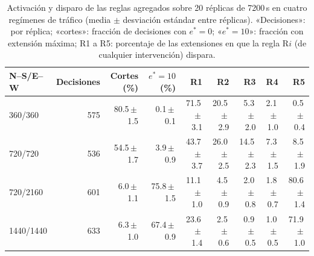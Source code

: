 \begin{table}[!t]
\caption{Activación y disparo de las reglas agregados sobre 20 réplicas de 7200\,s en cuatro regímenes de tráfico (media $\pm$ desviación estándar entre réplicas). «Decisiones»: por réplica; «cortes»: fracción de decisiones con $e^*=0$; «$e^*=10$»: fracción con extensión máxima; R1 a R5: porcentaje de las extensiones en que la regla R$i$ (de cualquier intervención) dispara.}
\label{tab:disparos}
\centering
\footnotesize
\setlength{\tabcolsep}{4pt}
\begin{tabular}{@{}lrrrrrrrr@{}}
\toprule
N--S/E--W & Decisiones & Cortes (\%) & $e^*=10$ (\%) & R1 & R2 & R3 & R4 & R5 \\
\midrule
360/360 & 575 & 80.5\,$\pm$\,1.5 & 0.1\,$\pm$\,0.1 & 71.5\,$\pm$\,3.1 & 20.5\,$\pm$\,2.9 & 5.3\,$\pm$\,2.0 & 2.1\,$\pm$\,1.0 & 0.5\,$\pm$\,0.4 \\
720/720 & 536 & 54.5\,$\pm$\,1.7 & 3.9\,$\pm$\,0.9 & 43.7\,$\pm$\,3.7 & 26.0\,$\pm$\,2.5 & 14.5\,$\pm$\,2.3 & 7.3\,$\pm$\,1.5 & 8.5\,$\pm$\,1.9 \\
720/2160 & 601 & 6.0\,$\pm$\,1.1 & 75.8\,$\pm$\,1.5 & 11.1\,$\pm$\,1.0 & 4.5\,$\pm$\,0.9 & 2.0\,$\pm$\,0.8 & 1.8\,$\pm$\,0.7 & 80.6\,$\pm$\,1.4 \\
1440/1440 & 633 & 6.3\,$\pm$\,1.0 & 67.4\,$\pm$\,0.9 & 23.6\,$\pm$\,1.4 & 2.5\,$\pm$\,0.6 & 0.9\,$\pm$\,0.5 & 1.0\,$\pm$\,0.5 & 71.9\,$\pm$\,1.0 \\
\bottomrule
\end{tabular}
\end{table}
